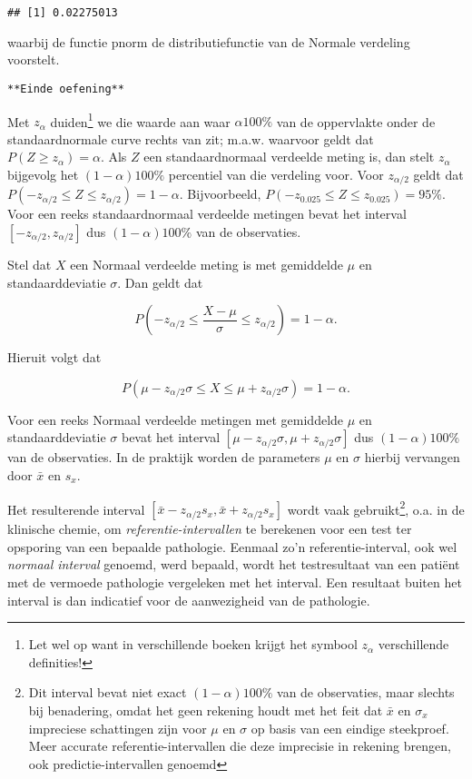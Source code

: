 \documentclass[12pt,dutch,coursenotes]{book}
\let\rmarkdownfootnote\footnote%
\def\footnote{\protect\rmarkdownfootnote}
\theoremstyle{definition}
\theoremstyle{definition}
\theoremstyle{definition}
\theoremstyle{remark}
\begin{document}
\begin{verbatim}
## [1] 0.02275013
\end{verbatim}

waarbij de functie pnorm de distributiefunctie van de Normale verdeling
voorstelt.

\texttt{**Einde\ oefening**}

Met \(z_{\alpha}\) duiden\footnote{Let wel op want in verschillende
  boeken krijgt het symbool \(z_{\alpha}\) verschillende definities!} we
die waarde aan waar \(\alpha100\%\) van de oppervlakte onder de
standaardnormale curve rechts van zit; m.a.w. waarvoor geldt dat
\(P(Z \geq z_{\alpha}) = \alpha\). Als \(Z\) een standaardnormaal
verdeelde meting is, dan stelt \(z_{\alpha}\) bijgevolg het
\((1-\alpha)100\%\) percentiel van die verdeling voor. Voor
\(z_{\alpha/2}\) geldt dat
\(P(-z_{\alpha/2}\leq Z \leq z_{\alpha/2}) = 1-\alpha\). Bijvoorbeeld,
\(P( - z_{0.025}\leq Z \leq z_{0.025}) = 95\%\). Voor een reeks
standaardnormaal verdeelde metingen bevat het interval
\([-z_{\alpha/2},z_{\alpha/2}]\) dus \((1-\alpha)100\%\) van de
observaties.

Stel dat \(X\) een Normaal verdeelde meting is met gemiddelde \(\mu\) en
standaarddeviatie \(\sigma\). Dan geldt dat

\begin{equation*}
P\left( - z_{\alpha/2}\leq \frac{X - \mu}{\sigma} \leq z_{\alpha/2}\right) =
1-\alpha .
\end{equation*}

Hieruit volgt dat

\begin{equation*}
P( \mu - z_{\alpha/2} \sigma \leq X \leq \mu + z_{\alpha/2} \sigma ) =
1-\alpha .
\end{equation*}

Voor een reeks Normaal verdeelde metingen met gemiddelde \(\mu\) en
standaarddeviatie \(\sigma\) bevat het interval
\([\mu-z_{\alpha/2}\sigma,\mu+z_{\alpha/2}\sigma]\) dus
\((1-\alpha)100\%\) van de observaties. In de praktijk worden de
parameters \(\mu\) en \(\sigma\) hierbij vervangen door \(\bar x\) en
\(s_x\).

Het resulterende interval
\([\bar x-z_{\alpha/2}s_x,\bar x+z_{\alpha/2}s_x]\) wordt vaak
gebruikt\footnote{Dit interval bevat niet exact \((1-\alpha)100\%\) van
  de observaties, maar slechts bij benadering, omdat het geen rekening
  houdt met het feit dat \(\bar x\) en \(\sigma_x\) impreciese
  schattingen zijn voor \(\mu\) en \(\sigma\) op basis van een eindige
  steekproef. Meer accurate referentie-intervallen die deze imprecisie
  in rekening brengen, ook predictie-intervallen genoemd}, o.a. in de
klinische chemie, om \emph{referentie-intervallen} te berekenen voor een
test ter opsporing van een bepaalde pathologie. Eenmaal zo'n
referentie-interval, ook wel \emph{normaal interval} genoemd, werd
bepaald, wordt het testresultaat van een patiënt met de vermoede
pathologie vergeleken met het interval. Een resultaat buiten het
interval is dan indicatief voor de aanwezigheid van de pathologie.
\end{document}
